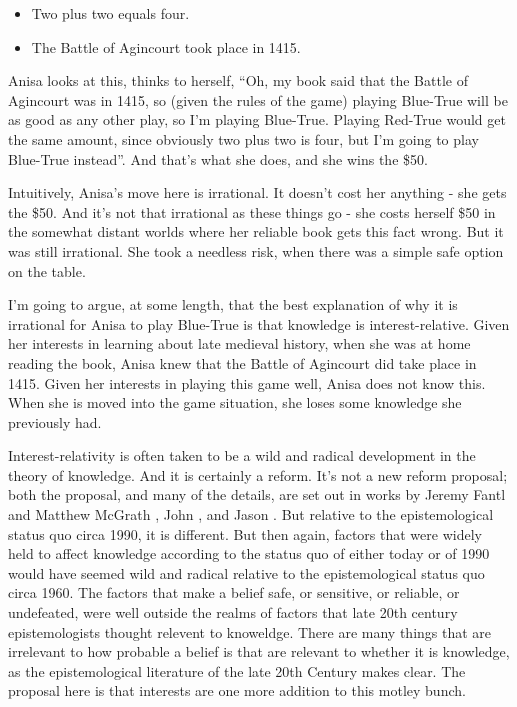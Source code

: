 \documentclass[11pt,]{book}
\providecommand{\tightlist}{%
  \setlength{\itemsep}{0pt}\setlength{\parskip}{0pt}}
\begin{document}
\begin{itemize}
\tightlist
\item
  Two plus two equals four.
\item
  The Battle of Agincourt took place in 1415.
\end{itemize}

Anisa looks at this, thinks to herself, ``Oh, my book said that the Battle of Agincourt was in 1415, so (given the rules of the game) playing Blue-True will be as good as any other play, so I'm playing Blue-True. Playing Red-True would get the same amount, since obviously two plus two is four, but I'm going to play Blue-True instead''. And that's what she does, and she wins the \$50.

Intuitively, Anisa's move here is irrational. It doesn't cost her anything - she gets the \$50. And it's not that irrational as these things go - she costs herself \$50 in the somewhat distant worlds where her reliable book gets this fact wrong. But it was still irrational. She took a needless risk, when there was a simple safe option on the table.

I'm going to argue, at some length, that the best explanation of why it is irrational for Anisa to play Blue-True is that knowledge is interest-relative. Given her interests in learning about late medieval history, when she was at home reading the book, Anisa knew that the Battle of Agincourt did take place in 1415. Given her interests in playing this game well, Anisa does not know this. When she is moved into the game situation, she loses some knowledge she previously had.

Interest-relativity is often taken to be a wild and radical development in the theory of knowledge. And it is certainly a reform. It's not a new reform proposal; both the proposal, and many of the details, are set out in works by Jeremy Fantl and Matthew McGrath \citetext{\citeyear{FantlMcGrath2002}; \citeyear{FantlMcGrath2009}}, John \citet{Hawthorne2004}, and Jason \citet{Stanley2005}. But relative to the epistemological status quo circa 1990, it is different. But then again, factors that were widely held to affect knowledge according to the status quo of either today or of 1990 would have seemed wild and radical relative to the epistemological status quo circa 1960. The factors that make a belief safe, or sensitive, or reliable, or undefeated, were well outside the realms of factors that late 20th century epistemologists thought relevent to knoweldge. There are many things that are irrelevant to how probable a belief is that are relevant to whether it is knowledge, as the epistemological literature of the late 20th Century makes clear. The proposal here is that interests are one more addition to this motley bunch.
\end{document}
